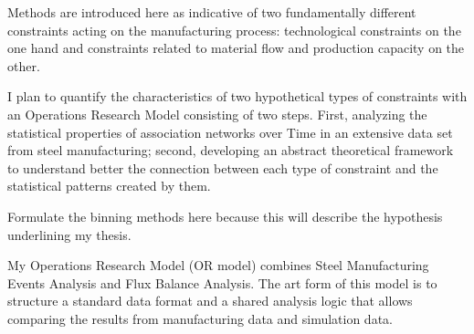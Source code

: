 {\color{red} 
	Methods are introduced here as indicative of two fundamentally different constraints acting on the manufacturing process: technological constraints on the one hand and constraints related to material flow and production capacity on the other.
	
	I plan to quantify the characteristics of two hypothetical types of constraints with an Operations Research Model consisting of two steps. First, analyzing the statistical properties of association networks over Time in an extensive data set from steel manufacturing; second, developing an abstract theoretical framework to understand better the connection between each type of constraint and the statistical patterns created by them. 
	
	Formulate the binning methods here because this will describe the hypothesis underlining my thesis.
	
	My Operations Research Model (OR model) combines Steel Manufacturing Events Analysis and Flux Balance Analysis. The art form of this model is to structure a standard data format and a shared analysis logic that allows comparing the results from manufacturing data and simulation data.
}